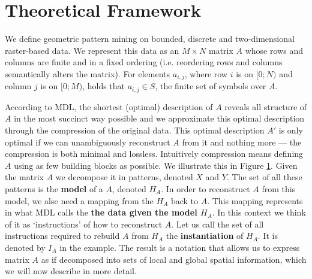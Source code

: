 \documentclass{llncs}
\begin{document}
\section{Theoretical Framework}



We define geometric pattern mining on bounded, discrete and two-dimensional raster-based data. We represent this data as an $M\times N$ matrix $A$ whose rows and columns are finite and in a fixed ordering (i.e. reordering rows and columns semantically alters the matrix). For elements $a_{i,j}$, where row $i$ is on $[0;N)$ and column $j$ is on $[0;M)$, holds that $a_{i,j} \in S$, the finite set of symbols over $A$. %

\begin{figure}[b]

\label{example1}
\end{figure}

According to MDL, the shortest (optimal) description of $A$ reveals all structure of $A$ in the most succinct way possible and we approximate this optimal description through the compression of the original data. This optimal description $A'$ is only optimal if we can unambiguously reconstruct $A$ from it and nothing more --- the compression is both minimal and lossless. Intuitively compression means defining $A$ using as few building blocks as possible. We illustrate this in Figure \ref{example1}. Given the matrix $A$ we decompose it in patterns, denoted $X$ and $Y$. The set of all these patterns is the \textbf{model} of a $A$, denoted $H_A$. In order to reconstruct $A$ from this model, we alse need a mapping from the $H_A$ back to $A$. This mapping represents in what MDL calls the \textbf{the data given the model $H_A$}. In this context we think of it as `instructions' of how to reconstruct $A$. Let us call the set of all instructions required to rebuild $A$ from $H_A$ the \textbf{instantiation} of $H_A$. It is denoted by ${I}_A$ in the example.  The result is a notation that allows us to express matrix $A$ as if decomposed into sets of local and global spatial information, which we will now describe in more detail.
\end{document}
